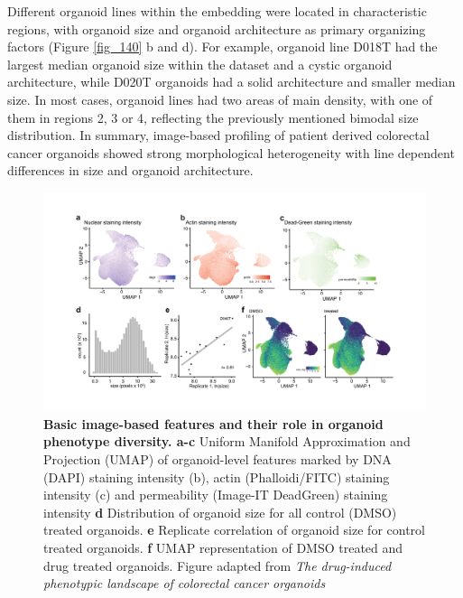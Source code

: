 \begin{flushleft}
Different organoid lines within the embedding were located in characteristic regions, with organoid size and organoid architecture as primary organizing factors (Figure \ref{fig_140} b and d). For example, organoid line D018T had the largest median organoid size within the dataset and a cystic organoid architecture, while D020T organoids had a solid architecture and smaller median size. In most cases, organoid lines had two areas of main density, with one of them in regions 2, 3 or 4, reflecting the previously mentioned bimodal size distribution. In summary, image-based profiling of patient derived colorectal cancer organoids showed strong morphological heterogeneity with line dependent differences in size and organoid architecture.

\begin{figure}[h]
\centering
\includegraphics[width=\textwidth,
                height=\textheight,
                keepaspectratio]{figures/promise/pdf/fig_1_5.pdf}
\caption[Basic image-based features and their role in organoid phenotype diversity]{\textbf{Basic image-based features and their role in organoid phenotype diversity. a-c} Uniform Manifold Approximation and Projection (UMAP) of organoid-level features marked by DNA (DAPI) staining intensity (b), actin (Phalloidi/FITC) staining intensity (c) and permeability (Image-IT DeadGreen) staining intensity \textbf{d} Distribution of organoid size for all control (DMSO) treated organoids. \textbf{e} Replicate correlation of organoid size for control treated organoids. \textbf{f} UMAP representation of DMSO treated and drug treated organoids. Figure adapted from \textit{The drug-induced phenotypic landscape of colorectal cancer organoids} \parencite{betgeDruginducedPhenotypicLandscape2022}}
\label{fig_145}
\end{figure}
\bigbreak


\end{flushleft}
